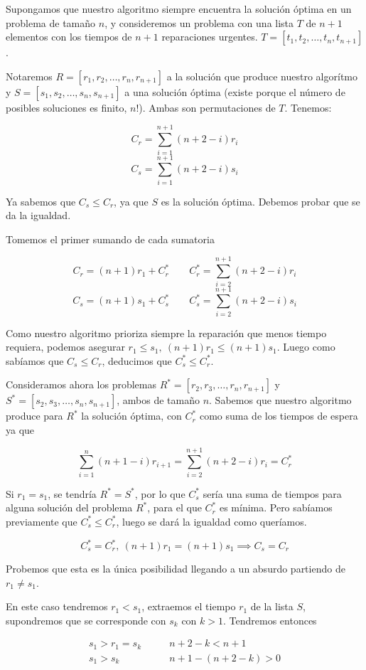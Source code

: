 \documentclass[a4]{article}
\begin{document}
Supongamos que nuestro algoritmo siempre encuentra la solución óptima
en un problema de tamaño $n$, y consideremos un problema con una
lista $T$ de $n+1$ elementos con los tiempos de $n+1$ reparaciones
urgentes.  $T=[t_1,t_2,\ldots,t_n,t_{n+1}]$.

Notaremos $R=[r_1,r_2,\ldots,r_n,r_{n+1}]$ a la solución que produce
nuestro algorítmo y $S=[s_1,s_2,\ldots,s_n,s_{n+1}]$ a una solución
óptima (existe porque el número de posibles soluciones es finito,
$n!$). Ambas son permutaciones de $T$. Tenemos: \vspace{-4mm}

\[C_r = \sum_{i=1}^{n+1} (n+2-i)r_i\]
\[C_s = \sum_{i=1}^{n+1} (n+2-i)s_i\]

Ya sabemos que $C_s \leq C_r$, ya que $S$ es la solución
óptima. Debemos probar que se da la igualdad.

Tomemos el primer sumando de cada sumatoria

\[C_r = (n+1)r_1 + C_r^* \qquad C_r^* = \sum_{i=2}^{n+1}(n+2-i)r_i\]
\[C_s = (n+1)s_1 + C_s^* \qquad C_s^* = \sum_{i=2}^{n+1}(n+2-i)s_i\]


Como nuestro algoritmo prioriza siempre la reparación que menos tiempo
requiera, podemos asegurar $r_1 \leq s_1, \ (n+1)r_1 \leq
(n+1)s_1$. Luego como sabíamos que $C_s \leq C_r$, deducimos que
$C_s^* \leq C_r^*$.

Consideramos ahora los problemas $R^*=[r_2,r_3,\ldots,r_n,r_{n+1}]$ y
$S^*=[s_2,s_3,\ldots,s_n,s_{n+1}]$, ambos de tamaño $n$. Sabemos que
nuestro algoritmo produce para $R^*$ la solución óptima, con $C^*_r$
como suma de los tiempos de espera ya que 

\[\sum_{i=1}^n(n+1-i)r_{i+1} = \sum_{i=2}^{n+1}(n+2-i)r_i = C^*_r\]

Si $r_1=s_1$, se tendría $R^*=S^*$, por lo que $C_s^*$ sería una suma
de tiempos para alguna solución del problema $R^*$, para el que $C_r^*$
es mínima. Pero sabíamos previamente que $C_s^* \leq C_r^*$, luego se
dará la igualdad como queríamos.

\[C_s^* = C_r^*, \ (n+1)r_1=(n+1)s_1 \implies C_s = C_r\]

Probemos que esta es la única posibilidad llegando a un absurdo
partiendo de $r_1 \neq s_1$.

En este caso tendremos $r_1 < s_1$, extraemos el
tiempo $r_1$ de la lista $S$, supondremos que se corresponde con $s_k$
con $k > 1$. Tendremos entonces

\begin{align*}
  s_1 > r_1 = s_k& \qquad n+2-k < n+1 \\
  s_1 > s_k& \qquad n+1 - (n+2-k) > 0 \\
\end{align*}
\end{document}
